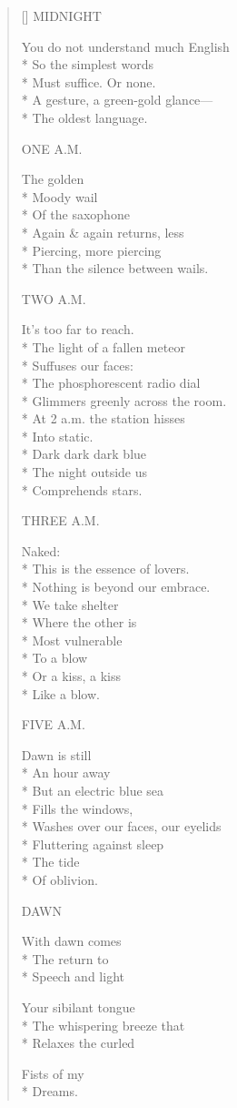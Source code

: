 \label{ch:night_early}
\settowidth{\versewidth}{Washes over our faces, our eyelids}
\begin{verse}[\versewidth]
MIDNIGHT

You do not understand much English\\*
So the simplest words\\*
Must suffice.     Or none.\\*
A gesture, a green-gold glance---\\*
The oldest language.

ONE A.M.

The golden\\*
Moody wail\\*
Of the saxophone\\*
Again \& again returns, less\\*
Piercing, more piercing\\*
Than the silence between wails.

TWO A.M.

It's too far to reach.\\*
The light of a fallen meteor\\*
Suffuses our faces:\\*
The phosphorescent radio dial\\*
Glimmers greenly across the room.\\*
At 2 a.m. the station hisses\\*
Into static.\\*
Dark dark dark blue\\*
The night outside us\\*
Comprehends stars.

THREE A.M.

Naked:\\*
This is the essence of lovers.\\*
Nothing is beyond our embrace.\\*
We take shelter\\*
Where the other is\\*
Most vulnerable\\*
To a blow\\*
Or a kiss, a kiss\\*
Like a blow.

FIVE A.M.

Dawn is still\\*
An hour away\\*
But an electric blue sea\\*
Fills the windows,\\*
Washes over our faces, our eyelids\\*
Fluttering against sleep\\*
The tide\\*
Of oblivion.

DAWN

With dawn comes\\*
The return to\\*
Speech and light

Your sibilant tongue\\*
The whispering breeze that\\*
Relaxes the curled

Fists of my\\*
Dreams.
\end{verse}
